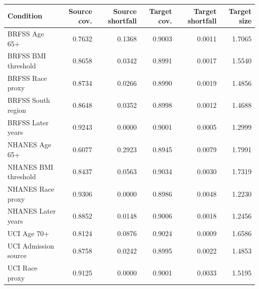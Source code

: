 \begin{tabular}{lrrrrr}
\toprule
Condition & Source cov. & Source shortfall & Target cov. & Target shortfall & Target size \\
\midrule
BRFSS Age 65+ & 0.7632 & 0.1368 & 0.9003 & 0.0011 & 1.7065 \\
BRFSS BMI threshold & 0.8658 & 0.0342 & 0.8991 & 0.0017 & 1.5540 \\
BRFSS Race proxy & 0.8734 & 0.0266 & 0.8990 & 0.0019 & 1.4856 \\
BRFSS South region & 0.8648 & 0.0352 & 0.8998 & 0.0012 & 1.4688 \\
BRFSS Later years & 0.9243 & 0.0000 & 0.9001 & 0.0005 & 1.2999 \\
NHANES Age 65+ & 0.6077 & 0.2923 & 0.8945 & 0.0079 & 1.7991 \\
NHANES BMI threshold & 0.8437 & 0.0563 & 0.9034 & 0.0030 & 1.7319 \\
NHANES Race proxy & 0.9306 & 0.0000 & 0.8986 & 0.0048 & 1.2230 \\
NHANES Later years & 0.8852 & 0.0148 & 0.9006 & 0.0018 & 1.2456 \\
UCI Age 70+ & 0.8124 & 0.0876 & 0.9024 & 0.0009 & 1.6586 \\
UCI Admission source & 0.8758 & 0.0242 & 0.8995 & 0.0022 & 1.4853 \\
UCI Race proxy & 0.9125 & 0.0000 & 0.9001 & 0.0033 & 1.5195 \\
\bottomrule
\end{tabular}
